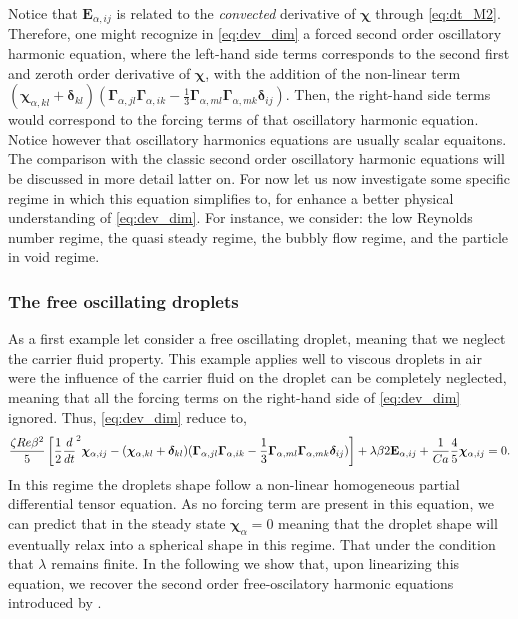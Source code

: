 Notice that $\textbf{E}_{\alpha,ij}$ is related to the \textit{convected} derivative of $\bm\chi$ through \ref{eq:dt_M2}. 
Therefore, one might recognize in \ref{eq:dev_dim} a forced second order oscillatory harmonic equation, where the left-hand side terms corresponds to the second first and zeroth order derivative of $\bm\chi$, with the addition of the non-linear term $ (\bm\chi_{\alpha,kl}+\bm\delta_{kl}) 
(\bm\Gamma_{\alpha,jl}\bm\Gamma_{\alpha,ik}  
- \frac{1}{3}
\bm\Gamma_{\alpha,ml}\bm\Gamma_{\alpha,mk}  
\bm\delta_{ij}
)$.
Then, the right-hand side terms would correspond to the forcing terms of that oscillatory harmonic equation.
Notice however that oscillatory harmonics equations are usually scalar equaitons. 
The comparison with the classic second order oscillatory harmonic equations will be discussed in more detail latter on. 
For now let us now investigate some specific regime in which this equation simplifies to, for enhance a better physical understanding of \ref{eq:dev_dim}. 
For instance, we consider: the low Reynolds number regime, the quasi steady regime, the bubbly flow regime, and the particle in void regime. 


\subsubsection{The free oscillating droplets}

As a first example let consider a free oscillating droplet, meaning that we neglect the carrier fluid property. 
This example applies well to viscous droplets in air were the influence of the carrier fluid on the droplet can be completely neglected, meaning that all the forcing terms on the right-hand side of \ref{eq:dev_dim} ignored. 
Thus, \ref{eq:dev_dim} reduce to, 
\begin{multline}
    \frac{\zeta Re \beta^2}{5}
    \left[
        \frac{1}{2}\frac{d}{dt}^2 \bm\chi_{\alpha,ij}
        -  ( \bm\chi_{\alpha,kl} +\bm\delta_{kl})
        (\bm\Gamma_{\alpha,jl}\bm\Gamma_{\alpha,ik}  
        - \frac{1}{3}
        \bm\Gamma_{\alpha,ml}\bm\Gamma_{\alpha,mk}  
        \bm\delta_{ij}
        )
    \right]
    + \lambda \beta 2 \textbf{E}_{\alpha,ij}
    + \frac{1}{Ca}
    \frac{4  }{5} \bm\chi_{\alpha,ij}
    =
    0.
\end{multline}
In this regime the droplets shape follow a non-linear homogeneous partial differential tensor equation. 
As no forcing term are present in this equation, we can predict that in the steady state $\bm\chi_\alpha = 0$ meaning that the droplet shape will eventually relax into a spherical shape in this regime.
That under the condition that $\lambda$ remains finite.   
In the following  we show that, upon linearizing this equation, we recover the second order free-oscilatory harmonic equations introduced by \citet{lamb1924hydrodynamics}. 

